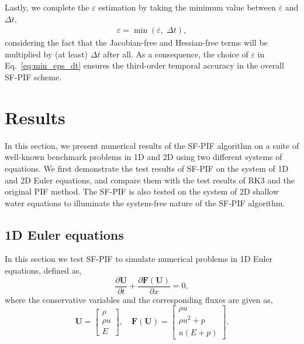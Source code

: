 \documentclass[times,preprint,3p]{elsarticle}
\newcommand{\pd}[2]{\frac{\partial #1}{\partial #2}}
\newcommand{\dt}{\Delta t}
\newcommand{\bF}{\mathbf{F}}
\newcommand{\bU}{\mathbf{U}}
\begin{document}
Lastly, we complete the \( \varepsilon \) estimation by
taking the minimum value between $\overline{\varepsilon}$ and $\dt$,
%
\begin{equation}\label{eq:min_eps_dt}
    \begin{split}
        \varepsilon = \min \left( \overline{\varepsilon}, \; \dt  \right),
    \end{split}
\end{equation}
%
considering the fact that
the Jacobian-free and Hessian-free terms
will be multiplied by (at least) \( \Delta t \) after all.
As a consequence, the choice of $\varepsilon$ in Eq.~\eqref{eq:min_eps_dt}
ensures the third-order temporal accuracy in the overall SF-PIF scheme.


\section{Results}\label{sec:results}
In this section, we present numerical results of the SF-PIF algorithm
on a suite of well-known benchmark problems in 1D and 2D
using two different systems of equations. We first demonstrate
the test results of SF-PIF on the system of 1D and 2D Euler equations,
and compare them with
the test results of RK3 and the original PIF method.
The SF-PIF is also tested on the system of 2D shallow water equations
to illuminate the system-free nature of the SF-PIF algorithm.


\subsection{1D Euler equations}\label{subsec:1d-euler}
In this section we test SF-PIF to simulate numerical problems
in 1D Euler equations, defined as,
\begin{equation}\label{eq:1d-gov}
    \pd{\bU}{t} + \pd{\bF(\bU)}{x} = 0,
\end{equation}
where the conservative variables and the corresponding fluxes are given as,
\begin{equation}\label{eq:1d-euler}
    \bU =
    \begin{bmatrix}
        \rho \\
        \rho u \\
        E
    \end{bmatrix}, \quad
    \bF (\bU) =
    \begin{bmatrix}
        \rho u \\
        \rho u^{2} + p \\
        u \left( E + p \right)
    \end{bmatrix}.
\end{equation}
\end{document}
